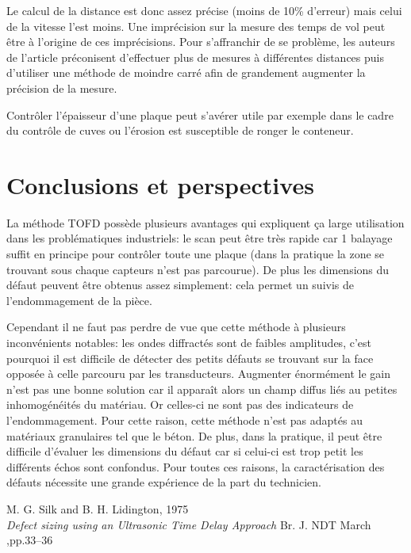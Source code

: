 \documentclass[twoside]{article}
\begin{document}
\begin{multicols}{2}
Le calcul de la distance est donc assez précise (moins de 10\% d'erreur) mais celui de la vitesse l'est moins. Une imprécision sur la mesure des temps de vol peut être à l'origine de ces imprécisions. Pour s'affranchir de se problème, les auteurs de l'article préconisent d'effectuer plus de mesures à différentes distances puis d'utiliser une méthode de moindre carré afin de grandement augmenter la précision de la mesure.

Contrôler l'épaisseur d'une plaque peut s'avérer utile par exemple dans le cadre du contrôle de cuves ou l'érosion est susceptible de ronger le conteneur.





\section{Conclusions et perspectives}
La méthode TOFD possède plusieurs avantages qui expliquent ça large utilisation dans les problématiques industriels: le scan peut être très rapide car 1 balayage suffit en principe pour contrôler toute une plaque (dans la pratique la zone se trouvant sous chaque capteurs n'est pas parcourue). De plus les dimensions du défaut peuvent être obtenus assez simplement: cela permet un suivis de l'endommagement de la pièce.

Cependant il ne faut pas perdre de vue que cette méthode à plusieurs inconvénients notables: les ondes diffractés sont de faibles amplitudes, c'est pourquoi il est difficile de détecter des petits défauts se trouvant sur la face opposée à celle parcouru par les transducteurs. Augmenter énormément le gain n'est pas une bonne solution car il apparaît alors un champ diffus liés au petites inhomogénéités du matériau. Or celles-ci ne sont pas des indicateurs de l'endommagement. Pour cette raison, cette méthode n'est pas adaptés au matériaux granulaires tel que le béton. De plus, dans la pratique, il peut être difficile d'évaluer les dimensions du défaut car si celui-ci est trop petit les différents échos sont confondus. Pour toutes ces raisons, la caractérisation des défauts nécessite une grande expérience de la part du technicien.


\begin{thebibliography}{99} %
M. G. Silk and B. H. Lidington, 1975 \\
\newblock \emph{ Defect  sizing  using  an Ultrasonic Time Delay Approach}
\newblock Br. J. NDT March ,pp.33–36



\end{thebibliography}
\end{multicols}
\end{document}
